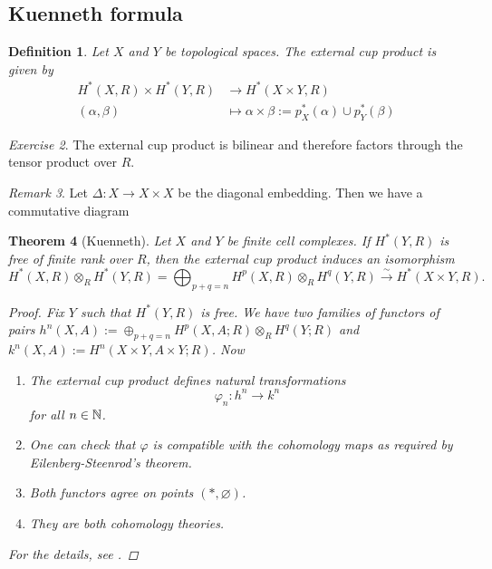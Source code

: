 \documentclass[A4paper, british, reqno]{amsart}
\theoremstyle{darkgreentheorem}
\newtheorem{thm}{Theorem}[section]
\theoremstyle{darkbluedefinition}
\newtheorem{defn}[thm]{Definition}
\theoremstyle{darkredexample}
\theoremstyle{remark}
\newtheorem{rem}[thm]{Remark}
\newtheorem{exe}[thm]{Exercise}
\newcommand{\1}{\mathbbm{1}}
\newcommand{\ot}{\otimes}
\newcommand{\op}{\oplus}
\newcommand{\tms}{\times}
\begin{document}
\subsection{Kuenneth formula}

\begin{defn}
    Let $X$ and $Y$ be topological spaces.
    The \textit{external cup product} is given by
    \begin{align*}
	H^{*}(X,R)\times H^{*}(Y,R) & \longrightarrow H^{*}(X\times Y,R) \\
	(\alpha,\beta) & \longmapsto \alpha\tms \beta:= p_{X}^{*}(\alpha)\cup p_{Y}^{*}(\beta)
    \end{align*}
\end{defn}

\begin{exe}
    The external cup product is bilinear and therefore factors through the tensor product over $R$.
\end{exe}

\begin{rem}
    Let $\Delta\colon X\to X\tms X$ be the diagonal embedding.
    Then we have a commutative diagram
    \begin{center}
    \end{center}
\end{rem}

\begin{thm}[Kuenneth]
    Let $X$ and $Y$ be finite cell complexes.
    If $H^{*}(Y,R)$ is free of finite rank over $R$, then the external cup product induces an isomorphism
    \[ H^{*}(X,R)\ot_{R}H^{*}(Y,R)=\bigoplus_{p+q=n}H^{p}(X,R)\ot_{R} H^{q}(Y,R)\xrightarrow{\sim} H^{*}(X\times Y,R). \]
    \begin{proof}
	Fix $Y$ such that $H^{*}(Y,R)$ is free.
	We have two families of functors of pairs $h^{n}(X,A):=\op_{p+q=n} H^{p}(X,A;R)\ot_{R}H^{q}(Y;R)$ and $k^{n}(X,A):=H^{n}(X\times Y,A\times Y;R)$.
	Now
	\begin{enumerate}
	    \item The external cup product defines natural transformations
		\[ \varphi_{n}\colon h^{n}\to k^{n} \]
		for all $n\in \mathbb{N}$.
	    \item One can check that $\varphi$ is compatible with the cohomology maps as required by Eilenberg-Steenrod's theorem.
	    \item Both functors agree on points $(*,\varnothing)$.
	    \item They are both cohomology theories.
	\end{enumerate}
	For the details, see \cite[Theorem 3.16]{hat02}.
    \end{proof}
\end{thm}
\end{document}
